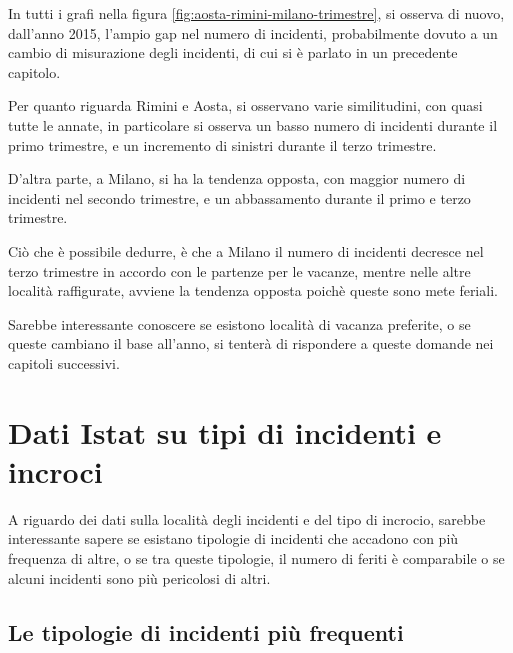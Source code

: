 \documentclass[a4paper]{report}
\begin{document}
In tutti i grafi nella figura \ref{fig:aosta-rimini-milano-trimestre}, 
si osserva di nuovo, dall'anno 2015, l'ampio gap nel numero di incidenti, 
probabilmente dovuto a un cambio di misurazione degli incidenti, di cui si 
è parlato in un precedente capitolo. 

Per quanto riguarda Rimini e Aosta, si osservano varie similitudini, con quasi 
tutte le annate, in particolare si osserva un basso numero di incidenti 
durante il primo trimestre, e un incremento di sinistri durante il terzo trimestre.

D'altra parte, a Milano, si ha la tendenza opposta, con maggior numero di 
incidenti nel secondo trimestre, e un abbassamento durante il primo 
e terzo trimestre.

Ciò che è possibile dedurre, è che a Milano il numero di incidenti decresce 
nel terzo trimestre in accordo con le partenze per le vacanze, mentre nelle 
altre località raffigurate, avviene la tendenza opposta poichè 
queste sono mete feriali.

Sarebbe interessante conoscere se esistono località di vacanza preferite, o se 
queste cambiano il base all'anno, si tenterà di rispondere a queste domande 
nei capitoli successivi.

\section{Dati Istat su tipi di incidenti e incroci}

A riguardo dei dati sulla località degli incidenti e del tipo di incrocio, 
sarebbe interessante sapere se esistano tipologie di incidenti che accadono 
con più frequenza di altre, o se tra queste tipologie, il numero di feriti 
è comparabile o se alcuni incidenti sono più pericolosi di altri.

\subsection{Le tipologie di incidenti più frequenti}
\end{document}
